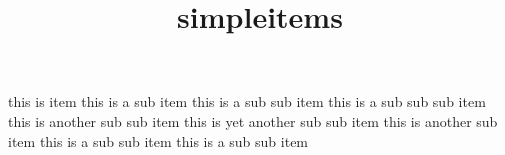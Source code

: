 \documentclass{ltjltxdoc}
\title{simpleitems}
\begin{document}
  \maketitle


  \begin{simpleitems}
  \item this is item
    \subitem this is a sub item
    \subsubitem this is a sub sub item
    \subsubsubitem this is a sub sub sub item
    \subsubitem this is another sub sub item
    \subsubitem this is yet another sub sub item
    \subitem this is another sub item
    \subsubitem this is a sub sub item
    \subsubsubitem this is a sub sub item
  \end{simpleitems}
\end{document}
